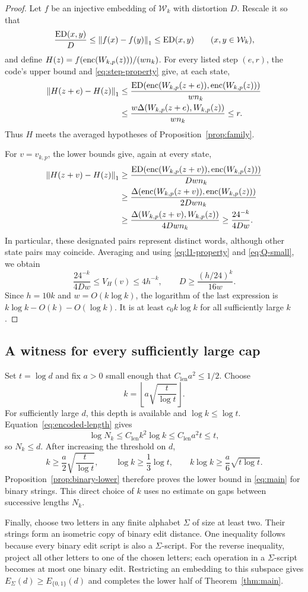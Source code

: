 \begin{proof}
Let $f$ be an injective embedding of $\mathcal W_k$ with distortion
$D$. Rescale it so that
\[
 \frac{\operatorname{ED}(x,y)}D\le\left\lVert f(x)-f(y)\right\rVert_1\le\operatorname{ED}(x,y)
 \qquad(x,y\in\mathcal W_k),
\]
and define $H(z)=f(\operatorname{enc}(W_{k,p}(z)))/(wn_k)$.
For every listed step $(e,r)$, the code's upper bound and
\eqref{eq:step-property} give, at each state,
\begin{align*}
 \left\lVert H(z+e)-H(z)\right\rVert_1
 &\le\frac{\operatorname{ED}(\operatorname{enc}(W_{k,p}(z+e)),\operatorname{enc}(W_{k,p}(z)))}{wn_k}\\
 &\le\frac{w\Delta(W_{k,p}(z+e),W_{k,p}(z))}{wn_k}\le r.
\end{align*}
Thus $H$ meets the averaged hypotheses of Proposition~\ref{prop:family}.

For $v=v_{k,p}$, the lower bounds give, again at every state,
\begin{align*}
 \left\lVert H(z+v)-H(z)\right\rVert_1
 &\ge\frac{\operatorname{ED}(\operatorname{enc}(W_{k,p}(z+v)),\operatorname{enc}(W_{k,p}(z)))}{Dwn_k}\\
 &\ge\frac{\Delta(\operatorname{enc}(W_{k,p}(z+v)),\operatorname{enc}(W_{k,p}(z)))}{2Dwn_k}\\
 &\ge\frac{\Delta(W_{k,p}(z+v),W_{k,p}(z))}{4Dwn_k}
 \ge\frac{24^{-k}}{4Dw}.
\end{align*}
In particular, these designated pairs represent distinct words,
although other state pairs may coincide. Averaging and using
\eqref{eq:l1-property} and \eqref{eq:Q-small}, we obtain
\[
 \frac{24^{-k}}{4Dw}\le V_H(v)\le4h^{-k},
 \qquad
 D\ge\frac{(h/24)^k}{16w}.
\]
Since $h=10k$ and $w=O(k\log k)$, the logarithm of the last expression
is $k\log k-O(k)-O(\log k)$. It is at least $c_0k\log k$ for all
sufficiently large $k$.
\end{proof}

\subsection{A witness for every sufficiently large cap}

Set $t=\log d$ and fix $a>0$ small enough that
$C_{\mathrm{len}}a^2\le1/2$. Choose
\[
 k=\left\lfloor a\sqrt{\frac{t}{\log t}}\right\rfloor.
\]
For sufficiently large $d$, this depth is available and
$\log k\le\log t$. Equation~\eqref{eq:encoded-length} gives
\[
 \log N_k\le C_{\mathrm{len}}k^2\log k
 \le C_{\mathrm{len}}a^2t\le t,
\]
so $N_k\le d$. After increasing the threshold on $d$,
\[
 k\ge\frac a2\sqrt{\frac{t}{\log t}},\qquad
 \log k\ge\frac13\log t,\qquad
 k\log k\ge\frac a6\sqrt{t\log t}.
\]
Proposition~\ref{prop:binary-lower} therefore proves the lower bound
in \eqref{eq:main} for binary strings. This direct choice of $k$ uses
no estimate on gaps between successive lengths $N_k$.

Finally, choose two letters in any finite alphabet $\Sigma$ of size
at least two. Their strings form an isometric copy of binary edit
distance. One inequality follows because every binary edit script is
also a $\Sigma$-script. For the reverse inequality, project all other
letters to one of the chosen letters; each operation in a
$\Sigma$-script becomes at most one binary edit. Restricting an
embedding to this subspace gives
$E_\Sigma(d)\ge E_{\{0,1\}}(d)$ and completes the lower half of
Theorem~\ref{thm:main}.
